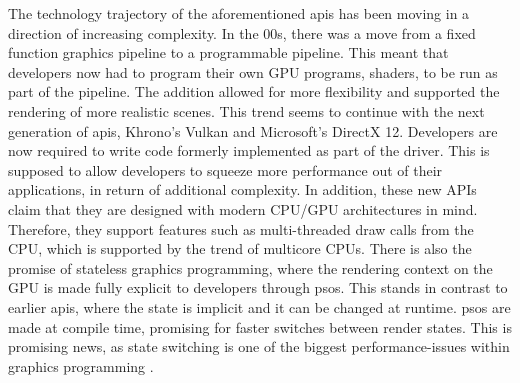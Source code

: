 The technology trajectory of the aforementioned \glspl{api} has been moving in a direction of increasing complexity.
In the 00s, there was a move from a fixed function graphics pipeline to a programmable pipeline.
This meant that developers now had to program their own GPU programs, shaders, to be run as part of the pipeline. 
The addition allowed for more flexibility and supported the rendering of more realistic scenes.
This trend seems to continue with the next generation of \glspl{api}, Khrono’s Vulkan and Microsoft’s DirectX 12. 
Developers are now required to write code formerly implemented as part of the driver. 
This is supposed to allow developers to squeeze more performance out of their applications,  in return of additional complexity. 
In addition, these new APIs claim that they are designed with modern CPU/GPU architectures in mind.  
Therefore, they support features such as multi-threaded draw calls from the CPU, which is supported by the trend of multicore CPUs. 
There is also the promise of stateless graphics programming, where the rendering context on the GPU is made fully explicit to developers through \glspl{pso}. 
This stands in contrast to earlier \glspl{api}, where the state is implicit and it can be changed at runtime. 
\glspl{pso} are made at compile time, promising for faster switches between render states.
This is promising news, as state switching is  one of the biggest performance-issues within graphics programming \cite{worister2013lazy}.